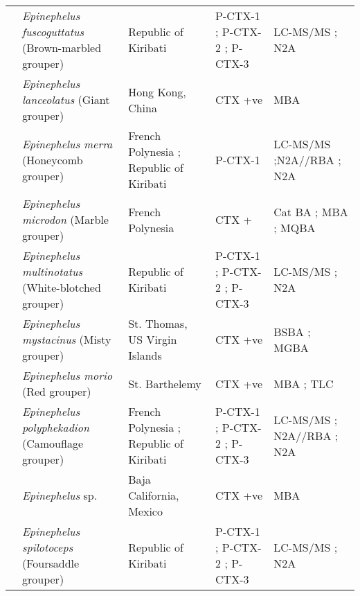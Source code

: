 \documentclass[12pt]{article}
\begin{document}
\begin{longtable}[l]{ | p{2cm} | p{3cm} | p{4.5cm} | p{2cm} | p{3cm} | }
	& \emph{Epinephelus fuscoguttatus} (Brown-marbled grouper) &  Republic of Kiribati \cite{mak2013pacific} & P-CTX-1 \cite{mak2013pacific}; P-CTX-2 \cite{mak2013pacific}; P-CTX-3 \cite{mak2013pacific} & LC-MS/MS \cite{mak2013pacific}; N2A \cite{mak2013pacific} \\
	& \emph{Epinephelus lanceolatus} (Giant grouper) & Hong Kong, China \cite{wong2009solid} & CTX +ve \cite{wong2009solid} & MBA \cite{wong2009solid} \\
	& \emph{Epinephelus merra} (Honeycomb grouper) & French Polynesia \cite{chinain2014mail}; Republic of Kiribati \cite{mak2013pacific} & P-CTX-1 \cite{mak2013pacific} &  LC-MS/MS \cite{mak2013pacific};N2A//RBA \cite{chinain2014mail}; N2A \cite{mak2013pacific} \\
	& \emph{Epinephelus microdon} (Marble grouper) & French Polynesia \cite{bagnis1987use} & CTX +\cite{bagnis1987use} & Cat BA \cite{bagnis1987use}; MBA \cite{bagnis1987use}; MQBA \cite{bagnis1987use} \\
	& \emph{Epinephelus multinotatus} (White-blotched grouper) & Republic of Kiribati \cite{mak2013pacific} & P-CTX-1 \cite{mak2013pacific}; P-CTX-2 \cite{mak2013pacific}; P-CTX-3 \cite{mak2013pacific} & LC-MS/MS \cite{mak2013pacific}; N2A \cite{mak2013pacific} \\
	& \emph{Epinephelus mystacinus} (Misty grouper) & St. Thomas, US Virgin Islands \cite{granade1976ciguatera} & CTX +ve \cite{granade1976ciguatera} & BSBA \cite{granade1976ciguatera}; MGBA \cite{granade1976ciguatera} \\
	& \emph{Epinephelus morio} (Red grouper) & St. Barthelemy \cite{vernoux1986heterogeneity} & CTX +ve\cite{vernoux1986heterogeneity} & MBA \cite{vernoux1986heterogeneity}; TLC \cite{vernoux1986heterogeneity} \\
	& \emph{Epinephelus polyphekadion} (Camouflage grouper) & French Polynesia \cite{chinain2014mail}; Republic of Kiribati \cite{mak2013pacific} & P-CTX-1 \cite{mak2013pacific}; P-CTX-2 \cite{mak2013pacific}; P-CTX-3 \cite{mak2013pacific} &  LC-MS/MS \cite{mak2013pacific}; N2A//RBA \cite{chinain2014mail}; N2A \cite{mak2013pacific}  \\
	& \emph{Epinephelus} sp. & Baja California, Mexico \cite{lechuga1995documented} & CTX +ve \cite{lechuga1995documented} & MBA \cite{lechuga1995documented} \\
	& \emph{Epinephelus spilotoceps} (Foursaddle grouper) & Republic of Kiribati \cite{mak2013pacific} & P-CTX-1 \cite{mak2013pacific}; P-CTX-2 \cite{mak2013pacific}; P-CTX-3 \cite{mak2013pacific} & LC-MS/MS \cite{mak2013pacific}; N2A \cite{mak2013pacific} \\

\end{longtable}
\end{document}
